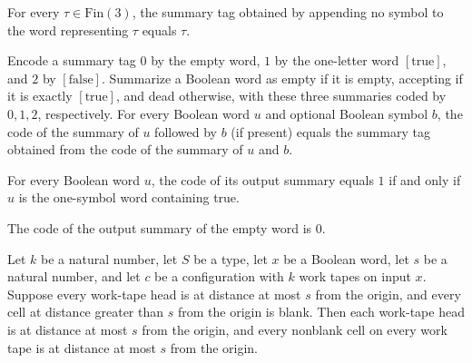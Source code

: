 \begin{theorem}
\label{Turing.summaryTag_none}
\leanok
{}
For every $\tau \in \mathrm{Fin}(3)$, the summary tag obtained by appending no symbol to
the word representing $\tau$ equals $\tau$.
\end{theorem}

\begin{theorem}
\label{Turing.summaryTag_append}
\leanok
{}
Encode a summary tag $0$ by the empty word, $1$ by the one-letter word
$[\mathrm{true}]$, and $2$ by $[\mathrm{false}]$. Summarize a Boolean word as empty if
it is empty, accepting if it is exactly $[\mathrm{true}]$, and dead otherwise, with
these three summaries coded by $0,1,2$, respectively. For every Boolean word $u$ and
optional Boolean symbol $b$, the code of the summary of $u$ followed by $b$ (if present)
equals the summary tag obtained from the code of the summary of $u$ and $b$.
\end{theorem}

\begin{theorem}
\label{Turing.outSummaryCode_eq_one_iff}
\leanok
{}
For every Boolean word $u$, the code of its output summary equals $1$ if and only if $u$
is the one-symbol word containing true.
\end{theorem}

\begin{theorem}
\label{Turing.outSummaryCode_nil}
\leanok
{}
The code of the output summary of the empty word is $0$.
\end{theorem}

\begin{theorem}
\label{Turing.Cfg.InWindow.core_bounds}
\leanok
{}
Let $k$ be a natural number, let $S$ be a type, let $x$ be a Boolean word, let $s$ be a
natural number, and let $c$ be a configuration with $k$ work tapes on input $x$. Suppose
every work-tape head is at distance at most $s$ from the origin, and every cell at
distance greater than $s$ from the origin is blank. Then each work-tape head is at
distance at most $s$ from the origin, and every nonblank cell on every work tape is at
distance at most $s$ from the origin.
\end{theorem}


